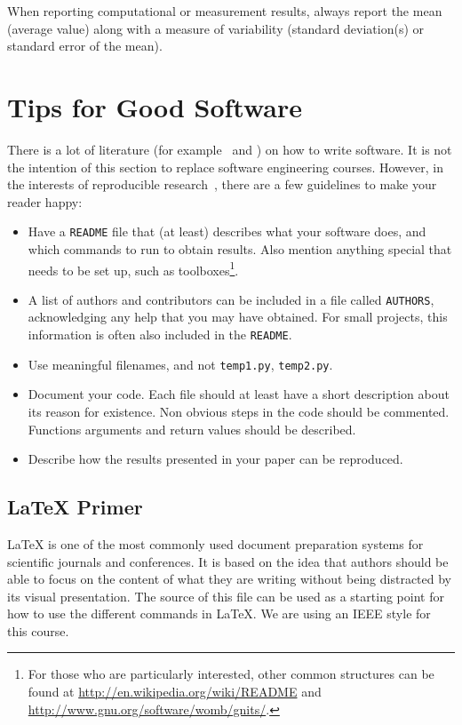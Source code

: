 \documentclass[10pt,conference,compsocconf]{IEEEtran}
\begin{document}
When reporting computational or measurement results, always
report the mean (average value) along with a measure of variability
(standard deviation(s) or standard error of the mean).


\section{Tips for Good Software}
\label{sec:tips-software}

There is a lot of literature (for example~\cite{hunt99pragmatic} and
\cite{spolsky04software}) on how to write software. It is not the
intention of this section to replace software engineering
courses. However, in the interests of reproducible
research~\cite{schwab00}, there are a few guidelines to make your
reader happy:
\begin{itemize}
\item Have a \texttt{README} file that (at least) describes what your
  software does, and which commands to run to obtain results. Also
  mention anything special that needs to be set up, such as
  toolboxes\footnote{For those who are
  particularly interested, other common structures can be found at
  \url{http://en.wikipedia.org/wiki/README} and
  \url{http://www.gnu.org/software/womb/gnits/}.}.
\item A list of authors and contributors can be included in a file
  called \texttt{AUTHORS}, acknowledging any help that you may have
  obtained. For small projects, this information is often also
  included in the \texttt{README}.
\item Use meaningful filenames, and not \texttt{temp1.py},
  \texttt{temp2.py}. 
\item Document your code. Each file should at least have a short
  description about its reason for existence. Non obvious steps in the
  code should be commented. Functions arguments and return values should be described.
\item Describe how the results presented in your paper can be reproduced.
\end{itemize}


\subsection{\LaTeX{} Primer}
\label{sec:latex-primer}

\LaTeX{} is one of the most commonly used document preparation systems
for scientific journals and conferences. It is based on the idea
that authors should be able to focus on the content of what they are
writing without being distracted by its visual presentation.
The source of this file can be used as a starting point for how to use
the different commands in \LaTeX{}. We are using an IEEE style for
this course.
\end{document}
